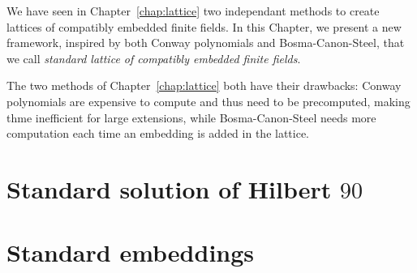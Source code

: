We have seen in Chapter~\ref{chap:lattice} two independant methods to create
lattices of compatibly embedded finite fields. In this Chapter, we present a new
framework, inspired by both Conway polynomials and Bosma-Canon-Steel, that we
call \emph{standard lattice of compatibly embedded finite fields}.
\minitoc


\clearpage
The two methods of Chapter~\ref{chap:lattice} both have their drawbacks: Conway
polynomials are expensive to compute and thus need to be precomputed, making
thme inefficient for large extensions, while Bosma-Canon-Steel needs more
computation each time an embedding is added in the lattice.
\section{Standard solution of Hilbert $90$}
\section{Standard embeddings}

